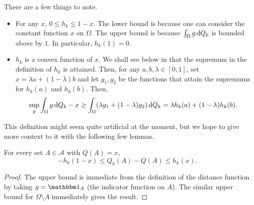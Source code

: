 There are a few things to note.
\begin{itemize}
    \item For any $x$, $0\leq h_k\leq 1-x$. The lower bound is because one can consider the constant function $x$ on $\Omega$. The upper bound is because $\int_\Omega g\operatorname{d}\!{Q}_k$ is bounded above by $1$. In particular, $h_k(1)=0$.
    \item $h_k$ is a convex function of $x$. We shall see below in  that the supremum in the definition of $h_k$ is attained. Then, for any $a,b,\lambda\in[0,1]$, set $x=\lambda a+(1-\lambda)b$ and let $g_1,g_2$ be the functions that attain the supremums for $h_k(a)$ and $h_k(b)$. Then,
    \[ \sup_g \int_\Omega g\operatorname{d}\!{Q}_k - x \geq \int_\Omega (\lambda g_1 + (1-\lambda)g_2) \operatorname{d}\!{Q}_k = \lambda h_k(a) + (1-\lambda) h_k(b). \]
\end{itemize}

This definition might seem quite artificial at the moment, but we hope to give more context to it with the following few lemmas.

\begin{lemma}
For every set $A\in\mathcal{A}$ with $Q(A)=x$,
\[ -h_k(1-x) \leq Q_k(A) - Q(A) \leq h_k(x). \]
\end{lemma}
\begin{proof}
The upper bound is immediate from the definition of the distance function by taking $g = \indic_A$ (the indicator function on $A$). The similar upper bound for $\Omega\setminus A$ immediately gives the result.
\end{proof}

